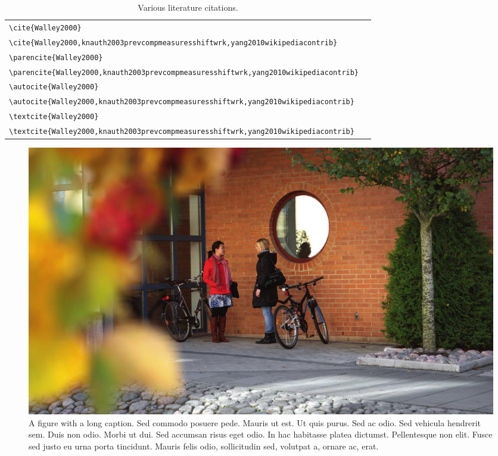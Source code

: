 \begin{table}
\caption{Various literature citations.}
\begin{tabular}{L{.6\linewidth}L{.3\linewidth}}%
\toprule%
\lstinline|\cite{Walley2000}| & \cite{Walley2000} \\[0.5em]%
\lstinline|\cite{Walley2000,knauth2003prevcompmeasuresshiftwrk,yang2010wikipediacontrib}| & \cite{Walley2000,knauth2003prevcompmeasuresshiftwrk,yang2010wikipediacontrib} \\
\midrule%
\lstinline|\parencite{Walley2000}| & \parencite{Walley2000} \\[0.5em]%
\lstinline|\parencite{Walley2000,knauth2003prevcompmeasuresshiftwrk,yang2010wikipediacontrib}| & \parencite{Walley2000,knauth2003prevcompmeasuresshiftwrk,yang2010wikipediacontrib} \\
\midrule%
\lstinline|\autocite{Walley2000}| & \autocite{Walley2000} \\[0.5em]%
\lstinline|\autocite{Walley2000,knauth2003prevcompmeasuresshiftwrk,yang2010wikipediacontrib}| & \autocite{Walley2000,knauth2003prevcompmeasuresshiftwrk,yang2010wikipediacontrib} \\
\midrule%
\lstinline|\textcite{Walley2000}| & \textcite{Walley2000} \\[0.5em]%
\lstinline|\textcite{Walley2000,knauth2003prevcompmeasuresshiftwrk,yang2010wikipediacontrib}| & \textcite{Walley2000,knauth2003prevcompmeasuresshiftwrk,yang2010wikipediacontrib} \\
\bottomrule%
\end{tabular}%
\label{tab:citations}
\end{table}

\begin{figure}
\centering
\includegraphics[width=\textwidth]{template/Manuscript/foto.jpg}
\caption{A figure with a long caption. Sed commodo posuere pede. Mauris ut est. Ut quis purus. Sed ac odio.
Sed vehicula hendrerit sem. Duis non odio. Morbi ut dui. Sed accumsan risus eget odio.
In hac habitasse platea dictumst. Pellentesque non elit. Fusce sed justo eu urna porta tincidunt.
Mauris felis odio, sollicitudin sed, volutpat a, ornare ac, erat.}
\label{fig:first_figure}
\end{figure}

